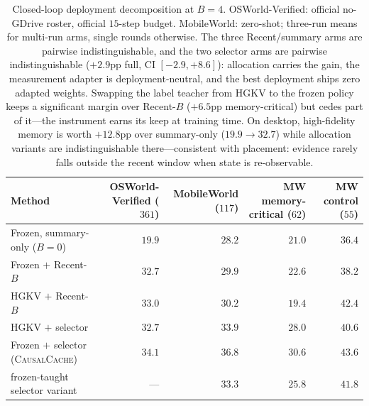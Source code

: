 \documentclass[letterpaper]{article} %
\newcommand{\method}{\textsc{CausalCache}}
\newcommand{\hgkv}{\textsc{HGKV}}
\begin{document}
\begin{table}[!t]
\centering
{\small
\setlength{\tabcolsep}{5.0pt}
\begin{tabular*}{\textwidth}{@{\extracolsep{\fill}}lrrrr@{}}
\toprule
Method & OSWorld-Verified ($361$) & MobileWorld ($117$) &
MW memory-critical ($62$) & MW control ($55$) \\
\midrule
Frozen, summary-only ($B{=}0$) & $19.9$ & $28.2$ & $21.0$ & $36.4$ \\
Frozen $+$ Recent-$B$ & $32.7$ & $29.9$ & $22.6$ & $38.2$ \\
\hgkv{} $+$ Recent-$B$ & $33.0$ & $30.2$ & $19.4$ & $42.4$ \\
\hgkv{} $+$ selector & $32.7$ & $33.9$ & $28.0$ & $40.6$ \\
Frozen $+$ selector (\method{}) & $\mathbf{34.1}$ & $\mathbf{36.8}$ &
$\mathbf{30.6}$ & $43.6$ \\
\hspace{5pt}frozen-taught selector variant & --- & $33.3$ & $25.8$ &
$41.8$ \\
\bottomrule
\end{tabular*}
}
\caption{Closed-loop deployment decomposition at $B{=}4$.
OSWorld-Verified: official no-GDrive roster, official $15$-step budget.
MobileWorld: zero-shot; three-run means for multi-run arms, single rounds
otherwise. The three Recent/summary arms are pairwise indistinguishable,
and the two selector arms are pairwise indistinguishable ($+2.9$pp full,
CI $[-2.9,+8.6]$): allocation carries the gain, the measurement adapter
is deployment-neutral, and the best deployment ships zero adapted
weights. Swapping the label teacher from \hgkv{} to the frozen policy
keeps a significant margin over Recent-$B$ ($+6.5$pp memory-critical) but
cedes part of it---the instrument earns its keep at training time. On
desktop, high-fidelity memory is worth $+12.8$pp over summary-only
($19.9\!\to\!32.7$) while allocation variants are indistinguishable
there---consistent with placement: evidence rarely falls outside the
recent window when state is re-observable.}
\label{tab:closed-loop}
\end{table}
\end{document}
